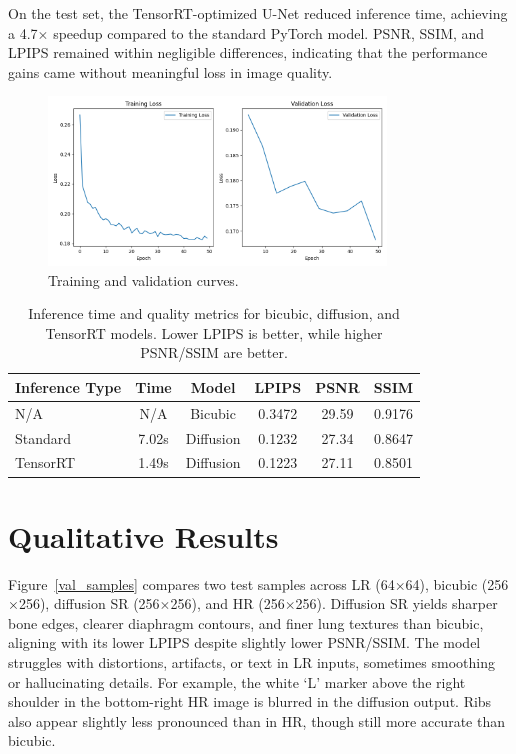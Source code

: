 \documentclass{article} %
\begin{document}
On the test set, the TensorRT-optimized U-Net reduced inference time, achieving a 4.7$\times$ speedup compared to the standard PyTorch model. PSNR, SSIM, and LPIPS remained within negligible differences, indicating that the performance gains came without meaningful loss in image quality.

\begin{figure}[h]
\begin{center}
\includegraphics[width=0.8\textwidth]{progress/Figs/trainv1loss.png}
\end{center}
\caption{Training and validation curves.}
\label{v1loss}
\end{figure}

\renewcommand{\arraystretch}{1.3}

\begin{table}[h!]
\centering
\caption{Inference time and quality metrics for bicubic, diffusion, and TensorRT models. Lower LPIPS is better, while higher PSNR/SSIM are better.}
\label{tab:sr_results}
\begin{tabular}{l c c c c c}
\toprule
\textbf{Inference Type} & 
\textbf{Time} & 
\textbf{Model} & 
\textbf{LPIPS} & 
\textbf{PSNR} & 
\textbf{SSIM} \\
\midrule
N/A        & N/A   & Bicubic   & 0.3472 & 29.59 & 0.9176 \\
Standard   & 7.02s & Diffusion & 0.1232 & 27.34 & 0.8647 \\
TensorRT   & 1.49s & Diffusion & 0.1223 & 27.11 & 0.8501 \\
\bottomrule
\end{tabular}
\end{table}

\section{Qualitative Results}

Figure~\ref{val_samples} compares two test samples across LR (64$\times$64), bicubic (256$\times$256), diffusion SR (256$\times$256), and HR (256$\times$256). Diffusion SR yields sharper bone edges, clearer diaphragm contours, and finer lung textures than bicubic, aligning with its lower LPIPS despite slightly lower PSNR/SSIM. The model struggles with distortions, artifacts, or text in LR inputs, sometimes smoothing or hallucinating details. For example, the white `L' marker above the right shoulder in the bottom-right HR image is blurred in the diffusion output. Ribs also appear slightly less pronounced than in HR, though still more accurate than bicubic.
\end{document}
